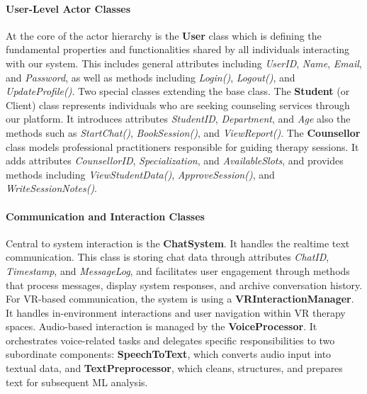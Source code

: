 \paragraph{User-Level Actor Classes}
At the core of the actor hierarchy is the \textbf{User} class which is defining the fundamental properties and functionalities shared by all individuals interacting with our system. This includes general attributes including \textit{UserID}, \textit{Name}, \textit{Email}, and \textit{Password}, as well as methods including \textit{Login()}, \textit{Logout()}, and \textit{UpdateProfile()}. Two special classes extending the base class. The \textbf{Student} (or Client) class represents individuals who are seeking counseling services through our platform. It introduces attributes \textit{StudentID}, \textit{Department}, and \textit{Age} also the methods such as \textit{StartChat()}, \textit{BookSession()}, and \textit{ViewReport()}. The \textbf{Counsellor} class models professional practitioners responsible for guiding therapy sessions. It adds attributes \textit{CounsellorID}, \textit{Specialization}, and \textit{AvailableSlots}, and provides methods including \textit{ViewStudentData()}, \textit{ApproveSession()}, and \textit{WriteSessionNotes()}.

\paragraph{Communication and Interaction Classes}
Central to system interaction is the \textbf{ChatSystem}. It handles the realtime text communication. This class is storing chat data through attributes  \textit{ChatID}, \textit{Timestamp}, and \textit{MessageLog}, and facilitates user engagement through methods that process messages, display system responses, and archive conversation history. For VR-based communication, the system is using a \textbf{VRInteractionManager}. It handles in-environment interactions and user navigation within VR therapy spaces. Audio-based interaction is managed by the \textbf{VoiceProcessor}. It orchestrates voice-related tasks and delegates specific responsibilities to two subordinate components: \textbf{SpeechToText}, which converts audio input into textual data, and \textbf{TextPreprocessor}, which cleans, structures, and prepares text for subsequent ML analysis.

